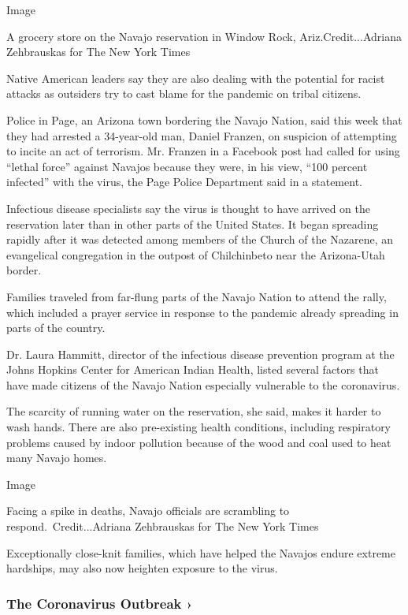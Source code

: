Image

A grocery store on the Navajo reservation in Window Rock,
Ariz.Credit...Adriana Zehbrauskas for The New York Times

Native American leaders say they are also dealing with the potential for
racist attacks as outsiders try to cast blame for the pandemic on tribal
citizens.

Police in Page, an Arizona town bordering the Navajo Nation, said this
week that they had arrested a 34-year-old man, Daniel Franzen, on
suspicion of attempting to incite an act of terrorism. Mr. Franzen in a
Facebook post had called for using ``lethal force'' against Navajos
because they were, in his view, ``100 percent infected'' with the virus,
the Page Police Department said in a statement.

Infectious disease specialists say the virus is thought to have arrived
on the reservation later than in other parts of the United States. It
began spreading rapidly after it was detected among members of the
Church of the Nazarene, an evangelical congregation in the outpost of
Chilchinbeto near the Arizona-Utah border.

Families traveled from far-flung parts of the Navajo Nation to attend
the rally, which included a prayer service in response to the pandemic
already spreading in parts of the country.

Dr. Laura Hammitt, director of the infectious disease prevention program
at the Johns Hopkins Center for American Indian Health, listed several
factors that have made citizens of the Navajo Nation especially
vulnerable to the coronavirus.

The scarcity of running water on the reservation, she said, makes it
harder to wash hands. There are also pre-existing health conditions,
including respiratory problems caused by indoor pollution because of the
wood and coal used to heat many Navajo homes.

Image

Facing a spike in deaths, Navajo officials are scrambling to
respond.~Credit...Adriana Zehbrauskas for The New York Times

Exceptionally close-knit families, which have helped the Navajos endure
extreme hardships, may also now heighten exposure to the virus.

\href{https://www.nytimes.com/news-event/coronavirus?action=click\&pgtype=Article\&state=default\&region=MAIN_CONTENT_3\&context=storylines_faq}{}

\hypertarget{the-coronavirus-outbreak-}{%
\subsubsection{The Coronavirus Outbreak
›}\label{the-coronavirus-outbreak-}}

